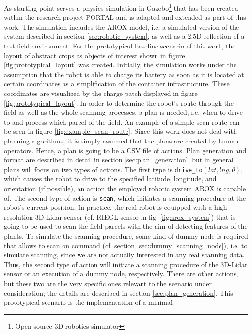 \documentclass[english, master, utf8]{base/thesis_KBS}
\newcommand{\code}[1]{\colorbox{light-gray}{\texttt{#1}}}
\begin{document}
As starting point serves a physics simulation in Gazebo\footnote{Open-source 3D robotics simulator} that has been created within the research project PORTAL \cite{portal}
and is adapted and extended as part of this work. The simulation includes the AROX model, i.e. a simulated version of the system described in section \ref{sec:robotic_system},
as well as a 2.5D reflection of a test field environment. For the prototypical baseline scenario of this work, the layout of abstract crops as objects of interest shown in 
figure \ref{fig:prototypical_layout} was created. Initially, the simulation works under the assumption that the robot is able to charge its battery as soon as it is located at 
certain coordinates as a simplification of the container infrastructure. These coordinates are visualized by the charge patch displayed in figure \ref{fig:prototypical_layout}.
In order to determine the robot's route through the field as well as the whole scanning processes, a plan is needed, i.e. when to drive to and process which parcel of the field. 
An example of a simple scan route can be seen in figure \ref{fig:example_scan_route}. Since this work does not deal with planning algorithms, it is simply assumed that the plans
are created by human operators. Hence, a plan is going to be a CSV file of actions. Plan generation and format are described in detail in section \ref{sec:plan_generation}, 
but in general plans will focus on two types of actions. The first type is \code{drive\_to$(lat, lng, \theta)$}, which causes the robot to drive to the specified latitude, 
longitude, and orientation (if possible), an action the employed robotic system AROX is capable of. The second type of action is \code{scan}, which initiates a scanning procedure
at the robot's current position. In practice, the real robot is equipped with a high-resolution 3D-Lidar sensor (cf. RIEGL sensor in fig. \ref{fig:arox_system}) that is going 
to be used to scan the field parcels with the aim of detecting features of the plants. To simulate the scanning procedure, some kind of dummy node is required that allows to 
scan on command (cf. section \ref{sec:dummy_scanning_node}), i.e. to simulate scanning, since we are not actually interested in any real scanning data. Thus, the second type 
of action will initiate a scanning procedure of the 3D-Lidar sensor or an execution of a dummy node, respectively. There are other actions, but these two are the very specific ones
relevant to the scenario under consideration; the details are described in section \ref{sec:plan_generation}. This prototypical scenario is the implementation of a minimal 
\end{document}
